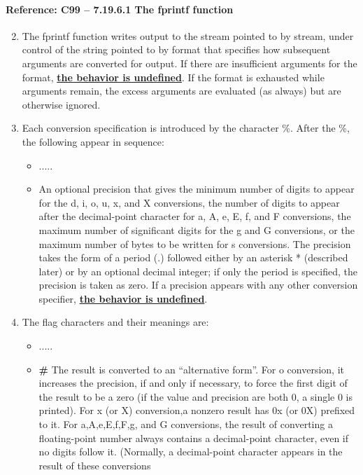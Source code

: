 \documentclass[11pt]{article}
\begin{document}
\paragraph{Reference: C99 -- 7.19.6.1 The fprintf function}
\begin{enumerate}
\setcounter{enumi}{1}
\item The fprintf function writes output to the stream pointed to by stream, under control of the 
string pointed to by format that specifies how subsequent arguments are converted for output. 
If there are insufficient arguments for the format, \underline{\bf the behavior is undefined}. 
If the format is exhausted while arguments remain, the excess arguments are evaluated 
(as always) but are otherwise ignored.
\setcounter{enumi}{3}\
\item Each conversion specification is introduced by the character \%. 
After the \%, the following appear in sequence:
\begin{itemize}
\item .....
\item An optional precision that gives the minimum number of digits to appear for 
the d, i, o, u, x, and X conversions, the number of digits to appear after the 
decimal-point character for a, A, e, E, f, and F conversions, the maximum number 
of significant digits for the g and G conversions, or the maximum number of 
bytes to be written for s conversions. The precision takes the form of 
a period (.) followed either by an asterisk * (described later) or by an 
optional decimal integer; if only the period is specified, the precision 
is taken as zero. If a precision appears with any other conversion 
specifier, \underline{\bf the behavior is undefined}.
\end{itemize}
\setcounter{enumi}{5}
\item  The flag characters and their meanings are:
\begin{itemize}
\item .....
\item {\bf \#} The result is converted to an ``alternative form''. For o conversion, 
it increases the precision, if and only if necessary, to force the first digit 
of the result to be a zero (if the value and precision are both 0, a single 0 
is printed). For x (or X) conversion,a nonzero result has 0x (or 0X) prefixed to it. 
For a,A,e,E,f,F,g, and G conversions, the result of converting a floating-point 
number always contains a decimal-point character, even if no digits follow it. 
(Normally, a decimal-point character appears in the result of these conversions 

\end{itemize}
\end{enumerate}
\end{document}
